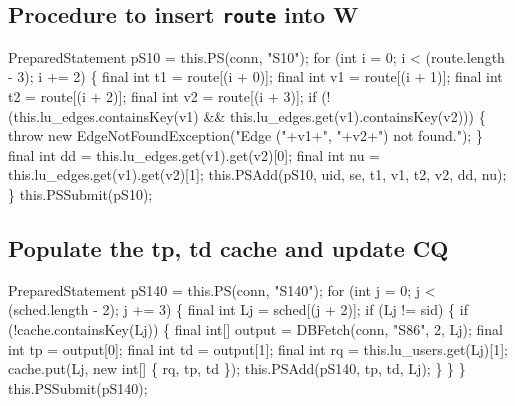 \subsection{Procedure to insert \texttt{route} into W}
\nwenddocs{}\endmoddef{}
PreparedStatement pS10 = this.PS(conn, "S10");
for (int i = 0; i < (route.length - 3); i += 2) \{
  final int t1 = route[(i + 0)];
  final int v1 = route[(i + 1)];
  final int t2 = route[(i + 2)];
  final int v2 = route[(i + 3)];
  if (!(this.lu_edges.containsKey(v1) && this.lu_edges.get(v1).containsKey(v2))) \{
    throw new EdgeNotFoundException("Edge ("+v1+", "+v2+") not found.");
  \}
  final int dd = this.lu_edges.get(v1).get(v2)[0];
  final int nu = this.lu_edges.get(v1).get(v2)[1];
  this.PSAdd(pS10, uid, se, t1, v1, t2, v2, dd, nu);
\}
this.PSSubmit(pS10);
\nwendcode{}\nwdocspar

\subsection{Populate the tp, td cache and update CQ}
\nwenddocs{}\endmoddef{}
PreparedStatement pS140 = this.PS(conn, "S140");
for (int j = 0; j < (sched.length - 2); j += 3) \{
  final int Lj = sched[(j + 2)];
  if (Lj != sid) \{
    if (!cache.containsKey(Lj)) \{
      final int[] output = DBFetch(conn, "S86", 2, Lj);
      final int tp = output[0];
      final int td = output[1];
      final int rq = this.lu_users.get(Lj)[1];
      cache.put(Lj, new int[] \{ rq, tp, td \});
      this.PSAdd(pS140, tp, td, Lj);
    \}
  \}
\}
this.PSSubmit(pS140);
\nwendcode{}\nwdocspar

